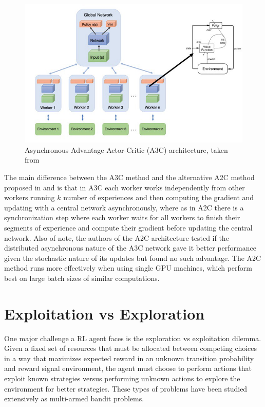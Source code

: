 \begin{figure}[h]
  \centering
  \includegraphics[width=\textwidth]{images/A3C.png}
  \caption{Asynchronous Advantage Actor-Critic (A3C) architecture, taken from \cite{A3CImag}} \label{A3CImag}
\end{figure}

The main difference between the \acrshort{A3C} method and the alternative \acrfull{A2C} method proposed in \cite{openaia2c} and \cite{a2c} is that in \acrshort{A3C} each worker works independently from other workers running $k$ number of experiences and then computing the gradient and updating with a central network asynchronously, where as in \acrshort{A2C} there is a synchronization step where each worker waits for all workers to finish their segments of experience and compute their gradient before updating the central network. Also of note, the authors of the \acrshort{A2C} architecture tested if the distributed asynchronous nature of the \acrshort{A3C} network gave it better performance given the stochastic nature of its updates but found no such advantage. The \acrshort{A2C} method runs more effectively when using single \acrshort{GPU} machines, which perform best on large batch sizes of similar computations.


\section{Exploitation vs Exploration} \label{section:EE}
\noindent One major challenge a \acrshort{RL} agent faces is the exploration vs exploitation dilemma. Given a fixed set of resources that must be allocated between competing choices in a way that maximizes expected reward in an unknown transition probability and reward signal environment, the agent must choose to perform actions that exploit known strategies versus performing unknown actions to explore the environment for better strategies. These types of problems have been studied extensively as multi-armed bandit problems.

